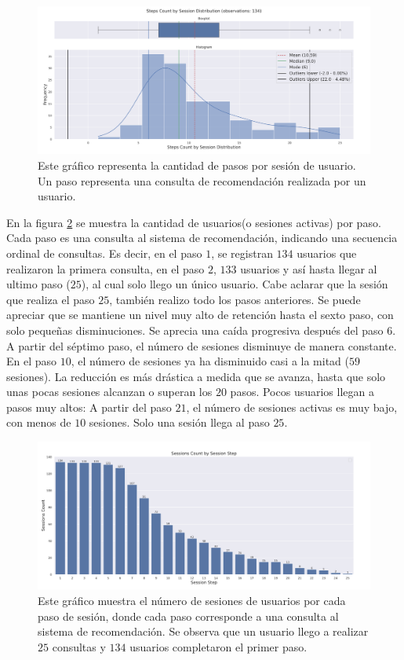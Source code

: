 \documentclass[11pt,a4paper,twoside]{thesis}
\begin{document}
\begin{figure}[H]
	\centering
	\includegraphics[width=15cm]{./images/llama2/steps_count_by_session_distribution.png}
	\caption{Este gráfico representa la cantidad de pasos por sesión de usuario. Un paso representa una consulta de recomendación realizada por un usuario.}
	\label{fig:llama2-steps_count_by_session_distribution}
\end{figure}

En la figura \ref{fig:llama2-sessions_count_by_session_step} se muestra la cantidad de usuarios(o sesiones activas) por paso. Cada paso es una consulta al sistema de recomendación, indicando una secuencia ordinal de consultas. Es decir, en el paso $1$, se registran $134$ usuarios que realizaron la primera consulta, en el paso $2$, $133$ usuarios y así hasta llegar al ultimo paso ($25$), al cual solo llego un único usuario. Cabe aclarar que la sesión que realiza el paso $25$, también realizo todo los pasos anteriores. Se puede apreciar que se mantiene un nivel muy alto de retención hasta el sexto paso, con solo pequeñas disminuciones.
Se aprecia una caída progresiva después del paso $6$. A partir del séptimo paso, el número de sesiones disminuye de manera constante. En el paso $10$, el número de sesiones ya ha disminuido casi a la mitad ($59$ sesiones). La reducción es más drástica a medida que se avanza, hasta que solo unas pocas sesiones alcanzan o superan los $20$ pasos.
Pocos usuarios llegan a pasos muy altos: A partir del paso $21$, el número de sesiones activas es muy bajo, con menos de $10$ sesiones. Solo una sesión llega al paso $25$.

\begin{figure}[H]
	\centering
	\includegraphics[width=15cm]{./images/llama2/sessions_count_by_session_step.png}
	\caption{Este gráfico muestra el número de sesiones de usuarios por  cada paso de sesión, donde cada paso corresponde a una consulta al sistema de recomendación. Se observa que un usuario llego a realizar $25$ consultas y $134$ usuarios completaron el primer paso.}
	\label{fig:llama2-sessions_count_by_session_step}
\end{figure}
\end{document}
